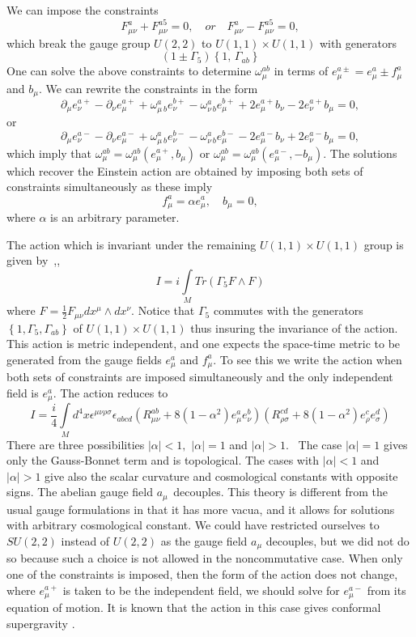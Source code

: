 \documentclass[a4paper,a4paper]{article}
\begin{document}
We can impose the constraints
\[
F_{\mu\nu}^{a}+F_{\mu\nu}^{a5}=0,\quad or\quad F_{\mu\nu}^{a}-F_{\mu\nu}%
^{a5}=0,
\]
which break the gauge group $U(2,2)$ to $U(1,1)\times U(1,1)$ with generators
\[
\left(  1\pm\Gamma_{5}\right)  \left\{  1,\,\Gamma_{ab}\right\}
\]
One can solve the above constraints to determine $\omega_{\mu}^{ab}$ in terms
of $e_{\mu}^{a\pm}=e_{\mu}^{a}\pm f_{\mu}^{a}$ and $b_{\mu}.$ We can rewrite
the constraints in the form
\[
\partial_{\mu}e_{\nu}^{a+}-\partial_{\nu}e_{\mu}^{a+}+\omega_{\mu\,b}%
^{a}e_{\nu}^{b+}-\omega_{\nu\,b}^{a}e_{\mu}^{b+}+2e_{\mu}^{a+}b_{\nu}-2e_{\nu
}^{a+}b_{\mu}=0,
\]
or
\[
\partial_{\mu}e_{\nu}^{a-}-\partial_{\nu}e_{\mu}^{a-}+\omega_{\mu\,b}%
^{a}e_{\nu}^{b-}-\omega_{\nu\,b}^{a}e_{\mu}^{b-}-2e_{\mu}^{a-}b_{\nu}+2e_{\nu
}^{a-}b_{\mu}=0,
\]
which imply that $\omega_{\mu}^{ab}=\omega_{\mu}^{ab}\left(  e_{\mu}%
^{a+},b_{\mu}\right)  $ or $\omega_{\mu}^{ab}=\omega_{\mu}^{ab}\left(  e_{\mu
}^{a-},-b_{\mu}\right)  .$ The solutions which recover the Einstein action are
obtained by imposing both sets of constraints simultaneously as these imply
\[
f_{\mu}^{a}=\alpha e_{\mu}^{a},\quad b_{\mu}=0,
\]
where $\alpha$ is an arbitrary parameter.

The action which is invariant under the remaining $U(1,1)\times U(1,1)$ group
is given by\ \cite{mcdowel},\cite{ortho},
\[
I=i\int\limits_{M}Tr\left(  \Gamma_{5}F\wedge F\right)
\]
where $F=\frac{1}{2}F_{\mu\nu}dx^{\mu}\wedge dx^{\nu}.$ Notice that
$\Gamma_{5}$ commutes with the generators $\left\{  1,\Gamma_{5},\Gamma
_{ab}\right\}  $ of $U(1,1)\times U(1,1)$ thus insuring the invariance of the
action. This action is metric independent, and one expects the space-time
metric to be generated from the gauge fields $e_{\mu}^{a}$ and $f_{\mu}^{a}.$
To see this we write the action when both sets of constraints are imposed
simultaneously and the only independent field is $e_{\mu}^{a}.$ The action
reduces to
\[
I=\frac{i}{4}\int\limits_{M}d^{4}x\epsilon^{\mu\nu\rho\sigma}\epsilon
_{abcd}\left(  R_{\mu\nu}^{ab}+8\left(  1-\alpha^{2}\right)  e_{\mu}^{a}%
e_{\nu}^{b}\right)  \left(  R_{\rho\sigma}^{cd}+8\left(  1-\alpha^{2}\right)
e_{\rho}^{c}e_{\sigma}^{d}\right)
\]
There are three possibilities $\left|  \alpha\right|  <1,$ $\left|
\alpha\right|  =1$ and $\left|  \alpha\right|  >1.$ \ The case $\left|
\alpha\right|  =1$ gives only the Gauss-Bonnet term and is topological. The
cases with $\left|  \alpha\right|  <1$ and $\left|  \alpha\right|  >1$ give
also the scalar curvature and cosmological constants with opposite signs. The
abelian gauge field $a_{\mu\text{ }}$decouples. This theory is different from
the usual gauge formulations in that it has more vacua, and it allows for
solutions with arbitrary cosmological constant. We could have restricted
ourselves to $SU(2,2)$ instead of $U(2,2)$ as the gauge field $a_{\mu}$
decouples, but we did not do so because such a choice is not allowed in the
noncommutative case. When only one of the constraints is imposed, then the
form of the action does not change, where $e_{\mu}^{a+}$ is taken to be the
independent field, we should solve for $e_{\mu}^{a-}$ from its equation of
motion. It is known that the action in this case gives conformal supergravity
\cite{physreport}.
\end{document}
